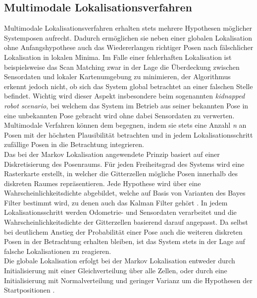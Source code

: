 \subsection{Multimodale Lokalisationsverfahren}
Multimodale Lokalisationsverfahren erhalten stets mehrere Hypothesen möglicher Systemposen aufrecht. Dadurch ermöglichen sie neben einer globalen Lokalisation ohne Anfangshypothese auch das Wiedererlangen richtiger Posen nach fälschlicher Lokalisation in lokalen Minima. Im Falle einer fehlerhaften Lokalisation ist beispielsweise das Scan Matching zwar in der Lage die Überdeckung zwischen Sensordaten und lokaler Kartenumgebung zu minimieren, der Algorithmus erkennt jedoch nicht, ob sich das System global betrachtet an einer falschen Stelle befindet. Wichtig wird dieser Aspekt insbesondere beim sogenannten \textit{kidnapped robot scenario}, bei welchem das System im Betrieb aus seiner bekannten Pose in eine unbekannten Pose gebracht wird \cite{Yic2011} ohne dabei Sensordaten zu verwerten. Multimodale Verfahren können dem begegnen, indem sie stets eine Anzahl \textit{n} an Posen mit der höchsten Plausibilität betrachten und in jedem Lokalisationsschritt zufällige Posen in die Betrachtung integrieren.\\

Das bei der Markov Lokalisation angewendete Prinzip basiert auf einer Diskretisierung des Posenraums. Für jeden Freiheitsgrad des Systems wird eine Rasterkarte erstellt, in welcher die Gitterzellen mögliche Posen innerhalb des diskreten Raumes repräsentieren. Jede Hypothese wird über eine Wahrscheinlichkeitsdichte abgebildet, welche auf Basis von Varianten des Bayes Filter \red[erklären? wo?] bestimmt wird, zu denen auch das Kalman Filter gehört \cite{Hertzberg2012}. In jedem Lokalisationsschritt werden Odometrie-  und Sensordaten verarbeitet und die Wahrscheinlichkeitsdichte der Gitterzellen basierend darauf angepasst. Da selbst bei deutlichem Anstieg der Probabilität einer Pose auch die weiteren diskreten Posen in der Betrachtung erhalten bleiben, ist das System stets in der Lage auf falsche Lokalisationen zu reagieren.\\
Die globale Lokalisation erfolgt bei der Markov Lokalisation entweder durch Initialisierung mit einer Gleichverteilung über alle Zellen, oder durch eine Initialisierung mit Normalverteilung und geringer Varianz um die Hypothesen der Startpositionen \cite{Hertzberg2012}.\\

